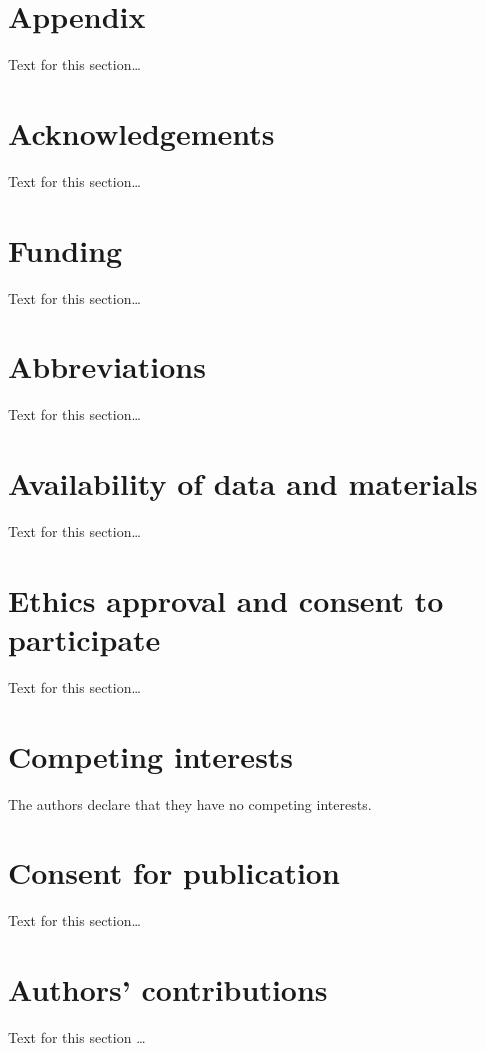 \documentclass{bmcart}\usepackage[]{graphicx}\usepackage[]{color}
\begin{document}
\section*{Appendix}
Text for this section\ldots


\begin{backmatter}

\section*{Acknowledgements}%
Text for this section\ldots

\section*{Funding}%
Text for this section\ldots

\section*{Abbreviations}%
Text for this section\ldots

\section*{Availability of data and materials}%
Text for this section\ldots

\section*{Ethics approval and consent to participate}%
Text for this section\ldots

\section*{Competing interests}
The authors declare that they have no competing interests.

\section*{Consent for publication}%
Text for this section\ldots

\section*{Authors' contributions}
Text for this section \ldots


\end{backmatter}
\end{document}
